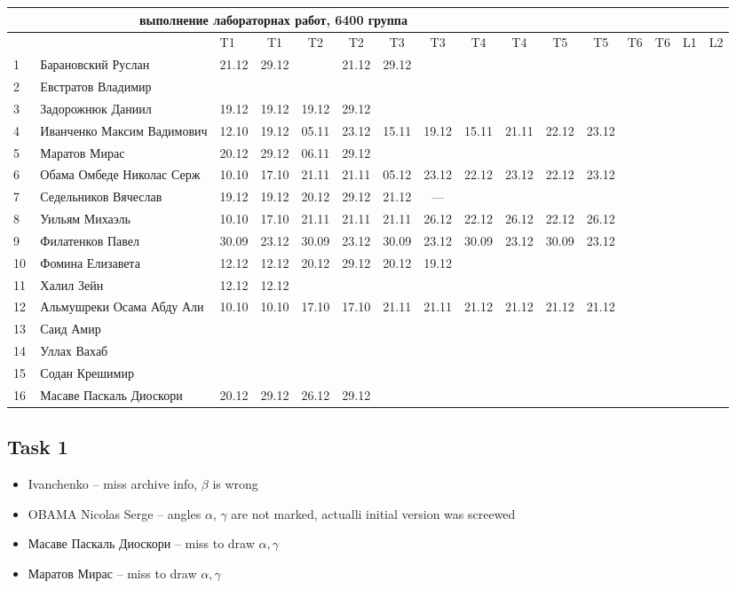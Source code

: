 \documentclass[a4paper,landscape,11pt]{article}
\begin{document}
\newpage
%
\hspace{-3.1cm} %
\begin{tabular}{l|llccc|cccc|cccccc}
\multicolumn{10}{c}{выполнение лабораторнах работ, 6400 группа} \\
\toprule
&&T1&T1& T2&T2& T3&T3& T4&T4&T5&T5&T6&T6&L1&L2\\
\midrule
1\,&  Барановский Руслан         &21.12& 29.12& & 21.12& 29.12&&&\\
2\,&  Евстратов Владимир         &&&&&&&&\\
3\,&  Задорожнюк Даниил          &19.12& 19.12& 19.12& 29.12& &&&\\
4\,&  Иванченко Максим Вадимович &12.10& 19.12& 05.11& 23.12& 15.11& 19.12& 15.11& 21.11& 22.12& 23.12\\
5\,&  Маратов Мирас              &20.12& 29.12& 06.11& 29.12&&&&\\
\midrule
6\,&  Обама Омбеде Николас Серж  &10.10& 17.10& 21.11& 21.11& 05.12& 23.12& 22.12& 23.12& 22.12& 23.12\\   %
7\,&  Седельников Вячеслав       &19.12& 19.12& 20.12& 29.12& 21.12&  --- &&\\
8\,&  Уильям Михаэль             &10.10& 17.10& 21.11& 21.11& 21.11& 26.12& 22.12& 26.12& 22.12&26.12 \\   %
9\,&  Филатенков Павел           &30.09 &23.12& 30.09& 23.12& 30.09& 23.12& 30.09& 23.12& 30.09& 23.12\\
10\,& Фомина Елизавета           &12.12& 12.12& 20.12& 29.12& 20.12& 19.12& &\\
\midrule
11\,& Халил Зейн                 &12.12& 12.12& &&&&&\\
12\,& Альмушреки Осама Абду Али  &10.10& 10.10& 17.10&17.10& 21.11&21.11& 21.12&21.12 & 21.12 & 21.12\\   %
13\,& Саид Амир                  &&&&&&&&\\
14\,& Уллах Вахаб                &&&&&&&&\\
15\,& Содан Крешимир             &&&&&&&&\\
16\,& Масаве Паскаль Диоскори    &20.12& 29.12& 26.12& 29.12&&&&\\
\bottomrule
\end{tabular}

\subsection{Task 1}
\begin{itemize}
\item Ivanchenko -- miss archive info, $\beta$ is wrong
\item OBAMA Nicolas Serge -- angles $\alpha$, $\gamma$ are not marked, actualli initial version was screewed
\item Масаве Паскаль Диоскори -- miss to draw $\alpha,\gamma$
\item Маратов Мирас  -- miss to draw $\alpha,\gamma$ 
\end{itemize}
\end{document}
